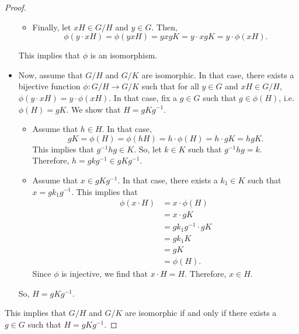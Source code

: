 \documentclass[a4paper, openany]{memoir}
\theoremstyle{definition}
\theoremstyle{plain}
\begin{document}
\begin{proof}
\begin{itemize}
\begin{itemize}
        \item Finally, let $xH \in G/H$ and $y \in G$. Then,
        \[\phi(y \cdot xH) = \phi(yxH) = yxgK = y \cdot xgK = y \cdot \phi(xH).\]
    \end{itemize}
    This implies that $\phi$ is an isomorphism.
    
    \item Now, assume that $G/H$ and $G/K$ are isomorphic. In that case, there exists a bijective function $\phi: G/H \to G/K$ such that for all $y \in G$ and $xH \in G/H$, $\phi(y \cdot xH) = y \cdot \phi(xH)$. In that case, fix a $g \in G$ such that $g \in \phi(H)$, i.e. $\phi(H) = gK$. We show that $H = gKg^{-1}$.
    \begin{itemize}
        \item Assume that $h \in H$. In that case,
        \[gK = \phi(H) = \phi(hH) = h \cdot \phi(H) = h \cdot gK = hgK.\]
        This implies that $g^{-1}hg \in K$. So, let $k \in K$ such that $g^{-1}hg = k$. Therefore, $h = gkg^{-1} \in gKg^{-1}$.
        
        \item Assume that $x \in gKg^{-1}$. In that case, there exists a $k_1 \in K$ such that $x = gk_1 g^{-1}$. This implies that
        \begin{align*}
            \phi(x \cdot H) &= x \cdot \phi(H) \\
            &= x \cdot gK \\
            &= gk_1g^{-1} \cdot gK \\
            &= gk_1K \\
            &= gK \\
            &= \phi(H).
        \end{align*}
        Since $\phi$ is injective, we find that $x \cdot H = H$. Therefore, $x \in H$.
    \end{itemize}
    So, $H = gKg^{-1}$.
\end{itemize}
This implies that $G/H$ and $G/K$ are isomorphic if and only if there exists a $g \in G$ such that $H = gKg^{-1}$.
\end{proof}
\end{document}
